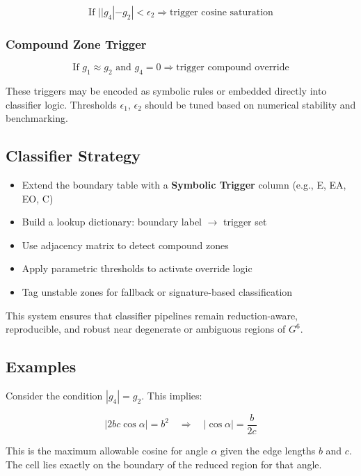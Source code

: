 \documentclass[preprint]{iucr}              %
\begin{document}
\[
\text{If } ||g_4| - g_2| < \epsilon_2 \Rightarrow \text{trigger cosine saturation}
\]



\subsubsection*{Compound Zone Trigger}



\[
\text{If } g_1 \approx g_2 \text{ and } g_4 = 0 \Rightarrow \text{trigger compound override}
\]



These triggers may be encoded as symbolic rules or embedded directly into classifier logic. Thresholds $\epsilon_1$, $\epsilon_2$ should be tuned based on numerical stability and benchmarking.

\subsection*{Classifier Strategy}

\begin{itemize}
\item Extend the boundary table with a \textbf{Symbolic Trigger} column (e.g., E, EA, EO, C)
\item Build a lookup dictionary: boundary label $\rightarrow$ trigger set
\item Use adjacency matrix to detect compound zones
\item Apply parametric thresholds to activate override logic
\item Tag unstable zones for fallback or signature-based classification
\end{itemize}

This system ensures that classifier pipelines remain reduction-aware, reproducible, and robust near degenerate or ambiguous regions of $G^6$.

\subsection*{Examples}

Consider the condition $|g_4| = g_2$. This implies:



\[
|2bc\cos\alpha| = b^2 \quad \Rightarrow \quad |\cos\alpha| = \frac{b}{2c}
\]



This is the maximum allowable cosine for angle $\alpha$ given the edge lengths $b$ and $c$. The cell lies exactly on the boundary of the reduced region for that angle.
\end{document}
